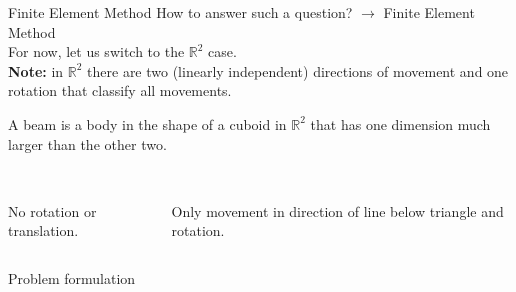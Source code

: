 \documentclass{beamer}
\numberwithin{equation}{aufgabe}
\newcommand\R{\mathbb R}
\begin{document}
\begin{frame}{Finite Element Method}
    How to answer such a question? \pause $\xrightarrow{}$ Finite Element Method\\
    For now, let us switch to the $\R^2$ case.\\ \pause
    \textbf{Note:} in $\R^2$ there are two (linearly independent) directions of movement and one rotation that classify all movements.
    \pause
    \begin{definition}[Beam]
        A beam is a body in the shape of a cuboid in $\R^2$ that has one dimension much larger than the other two.
    \end{definition}
    \pause
    \begin{definition}[Supports]
        \begin{columns}
        \begin{column}{0.4\textwidth}
            \\
            No rotation or translation.
        \end{column}
        \pause
        \begin{column}{0.5\textwidth}
            \\
            Only movement in direction of line below triangle and rotation.
        \end{column}
        \end{columns}
    \end{definition}

\end{frame}

\begin{frame}{Problem formulation}

\end{frame}
\end{document}
